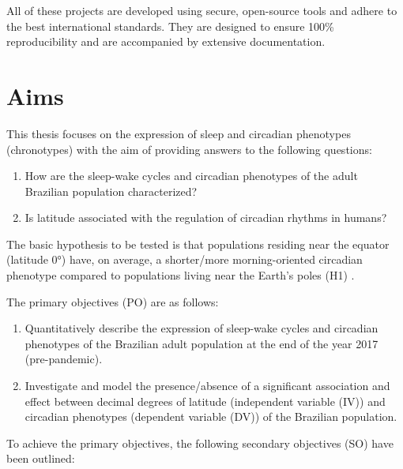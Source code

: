 \documentclass[
12pt,
openright,
oneside,
a4paper,
chapter=TITLE,
section=TITLE,
french,
spanish,
brazil,
english
]{abntex2}\usepackage{array}
\newcommand{\microskip}{\vspace{\microskipamount}}
\begin{document}
All of these projects are developed using secure, open-source tools and
adhere to the best international standards. They are designed to ensure
100\% reproducibility and are accompanied by extensive documentation.

\section{Aims}\label{aims}

This thesis focuses on the expression of sleep and circadian phenotypes
(chronotypes) with the aim of providing answers to the following
questions:

\begin{enumerate}
\def\labelenumi{\arabic{enumi}.}
\item
  How are the sleep-wake cycles and circadian phenotypes of the adult
  Brazilian population characterized?
\item
  Is latitude associated with the regulation of circadian rhythms in
  humans?
\end{enumerate}

The basic hypothesis to be tested is that populations residing near the
equator (latitude 0°) have, on average, a shorter/more morning-oriented
circadian phenotype compared to populations living near the Earth's
poles (H1)
\autocite{hut2013,leocadio-miguel2014,leocadio-miguel2017,pittendrigh1991,randler2008,randler2017,roenneberg2003}.

The primary objectives (PO) are as follows:

\microskip

\begin{enumerate}
\def\labelenumi{\Alph{enumi})}
\item
  Quantitatively describe the expression of sleep-wake cycles and
  circadian phenotypes of the Brazilian adult population at the end of
  the year 2017 (pre-pandemic).
\item
  Investigate and model the presence/absence of a significant
  association and effect between decimal degrees of latitude
  (independent variable (IV)) and circadian phenotypes (dependent
  variable (DV)) of the Brazilian population.
\end{enumerate}

\microskip

To achieve the primary objectives, the following secondary objectives
(SO) have been outlined:

\microskip
\end{document}
